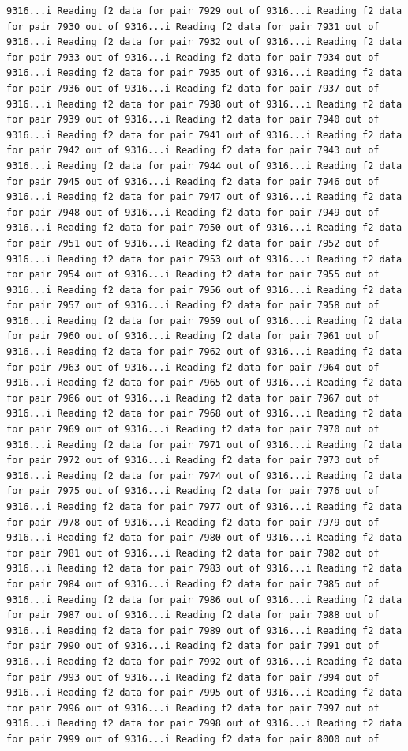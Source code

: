 \documentclass[
]{article}
\begin{document}
\begin{verbatim}
9316...i Reading f2 data for pair 7929 out of 9316...i Reading f2 data for pair 7930 out of 9316...i Reading f2 data for pair 7931 out of 9316...i Reading f2 data for pair 7932 out of 9316...i Reading f2 data for pair 7933 out of 9316...i Reading f2 data for pair 7934 out of 9316...i Reading f2 data for pair 7935 out of 9316...i Reading f2 data for pair 7936 out of 9316...i Reading f2 data for pair 7937 out of 9316...i Reading f2 data for pair 7938 out of 9316...i Reading f2 data for pair 7939 out of 9316...i Reading f2 data for pair 7940 out of 9316...i Reading f2 data for pair 7941 out of 9316...i Reading f2 data for pair 7942 out of 9316...i Reading f2 data for pair 7943 out of 9316...i Reading f2 data for pair 7944 out of 9316...i Reading f2 data for pair 7945 out of 9316...i Reading f2 data for pair 7946 out of 9316...i Reading f2 data for pair 7947 out of 9316...i Reading f2 data for pair 7948 out of 9316...i Reading f2 data for pair 7949 out of 9316...i Reading f2 data for pair 7950 out of 9316...i Reading f2 data for pair 7951 out of 9316...i Reading f2 data for pair 7952 out of 9316...i Reading f2 data for pair 7953 out of 9316...i Reading f2 data for pair 7954 out of 9316...i Reading f2 data for pair 7955 out of 9316...i Reading f2 data for pair 7956 out of 9316...i Reading f2 data for pair 7957 out of 9316...i Reading f2 data for pair 7958 out of 9316...i Reading f2 data for pair 7959 out of 9316...i Reading f2 data for pair 7960 out of 9316...i Reading f2 data for pair 7961 out of 9316...i Reading f2 data for pair 7962 out of 9316...i Reading f2 data for pair 7963 out of 9316...i Reading f2 data for pair 7964 out of 9316...i Reading f2 data for pair 7965 out of 9316...i Reading f2 data for pair 7966 out of 9316...i Reading f2 data for pair 7967 out of 9316...i Reading f2 data for pair 7968 out of 9316...i Reading f2 data for pair 7969 out of 9316...i Reading f2 data for pair 7970 out of 9316...i Reading f2 data for pair 7971 out of 9316...i Reading f2 data for pair 7972 out of 9316...i Reading f2 data for pair 7973 out of 9316...i Reading f2 data for pair 7974 out of 9316...i Reading f2 data for pair 7975 out of 9316...i Reading f2 data for pair 7976 out of 9316...i Reading f2 data for pair 7977 out of 9316...i Reading f2 data for pair 7978 out of 9316...i Reading f2 data for pair 7979 out of 9316...i Reading f2 data for pair 7980 out of 9316...i Reading f2 data for pair 7981 out of 9316...i Reading f2 data for pair 7982 out of 9316...i Reading f2 data for pair 7983 out of 9316...i Reading f2 data for pair 7984 out of 9316...i Reading f2 data for pair 7985 out of 9316...i Reading f2 data for pair 7986 out of 9316...i Reading f2 data for pair 7987 out of 9316...i Reading f2 data for pair 7988 out of 9316...i Reading f2 data for pair 7989 out of 9316...i Reading f2 data for pair 7990 out of 9316...i Reading f2 data for pair 7991 out of 9316...i Reading f2 data for pair 7992 out of 9316...i Reading f2 data for pair 7993 out of 9316...i Reading f2 data for pair 7994 out of 9316...i Reading f2 data for pair 7995 out of 9316...i Reading f2 data for pair 7996 out of 9316...i Reading f2 data for pair 7997 out of 9316...i Reading f2 data for pair 7998 out of 9316...i Reading f2 data for pair 7999 out of 9316...i Reading f2 data for pair 8000 out of 
\end{verbatim}
\end{document}
